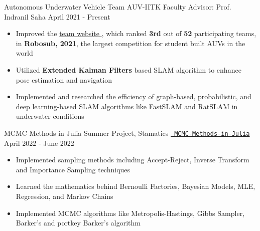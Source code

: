 \cventry
{Autonomous Underwater Vehicle} %
{Team AUV-IITK} %
{Faculty Advisor: Prof. Indranil Saha} %
{April 2021 - Present} %
{
  \begin{itemize} %
    \item {Improved the \href{https://auv.sntiitk.in/}{team website {\small \faExternalLink{}}}, which ranked \textbf{3rd} out of \textbf{52} participating teams, in \textbf{Robosub, 2021}}, the largest competition for student built AUVs in the world
    \item Utilized \textbf{Extended Kalman Filters} based SLAM algorithm to enhance pose estimation and navigation
    \item Implemented and researched the efficiency of graph-based, probabilistic, and deep learning-based SLAM algorithms like FastSLAM and RatSLAM in underwater conditions
  \end{itemize}
}
  \cventry
  {MCMC Methods in Julia}
  {Summer Project, Stamatics}
  {\texttt{\href{https://github.com/abhishekshree/mcmc-methods-in-julia}{\faGithub{} MCMC-Methods-in-Julia}}}
  {April 2022 - June 2022}
  {
    \begin{itemize}
      \item Implemented sampling methods including Accept-Reject, Inverse Transform and Importance Sampling techniques
      \item Learned the mathematics behind Bernoulli Factories, Bayesian Models, MLE, Regression, and Markov Chains
      \item Implemented MCMC algorithms like Metropolis-Hastings, Gibbs Sampler, Barker's and portkey Barker’s algorithm
    \end{itemize}
  }
